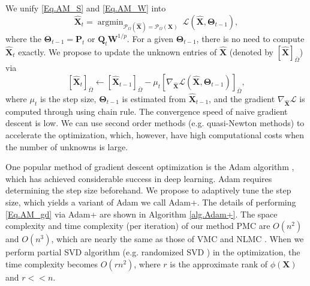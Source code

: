 \documentclass[letterpaper]{article} %
\begin{document}
We unify \eqref{Eq.AM_S} and \eqref{Eq.AM_W} into
\begin{equation}\label{Eq.AM_unif}
\hat{\bm{X}}_t=\mathop{\arg\min}_{\mathcal{P}_{\Omega}(\hat{\bm{X}})=\mathcal{P}_{\Omega}(\bm{X})}\ \mathcal{L}(\hat{\bm{X}},\bm{\Theta}_{t-1}),
\end{equation}
where the $\bm{\Theta}_{t-1}=\bm{P}_t$ or $\bm{Q}_t\bm{W}^{1/p}$. For a given $\bm{\Theta}_{t-1}$, there is no need to compute $\hat{\bm{X}}_t$ exactly. We propose to update the unknown entries of $\hat{\bm{X}}$ (denoted by $[\hat{\bm{X}}]_{\bar{\Omega}}$) via
\begin{equation}\label{Eq.AM_gd}
[\hat{\bm{X}}_t]_{\bar{\Omega}}\leftarrow [\hat{\bm{X}}_{t-1}]_{\bar{\Omega}}-\mu_t[\nabla_{\hat{\bm{X}}}\mathcal{L}(\hat{\bm{X}},\bm{\Theta}_{t-1})]_{\bar{\Omega}},
\end{equation}
where $\mu_t$ is the step size, $\bm{\Theta}_{t-1}$ is estimated from $\hat{\bm{X}}_{t-1}$, and the gradient $\nabla_{\hat{\bm{X}}}\mathcal{L}$ is computed through using chain rule. The convergence speed of naive gradient descent is low. We can use second order methods (e.g. quasi-Newton methods) to accelerate the optimization, which, however, have high computational costs when the number of unknowns is large.

One popular method of gradient descent optimization is the Adam algorithm \cite{adam2014}, which has achieved considerable success in deep learning.
Adam requires determining the step size beforehand. We propose to adaptively tune the step size, which yields a variant of Adam we call Adam+. The details of performing \eqref{Eq.AM_gd} via Adam+ are shown in Algorithm \ref{alg.Adam+}. The space complexity and time complexity (per iteration) of our method PMC are $O(n^2)$ and $O(n^3)$, which are nearly the same as those of VMC \cite{pmlr-v70-ongie17a} and NLMC \cite{FANNLMC}. When we perform partial SVD algorithm (e.g. randomized SVD \cite{randomsvd}) in the optimization, the time complexity becomes $O(rn^2)$, where $r$ is the approximate rank of $\phi(\bm{X})$ and $r<<n$.
\end{document}
